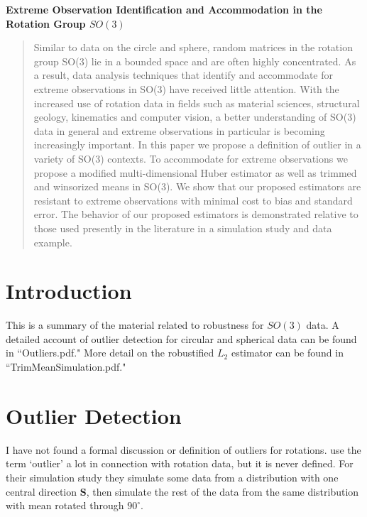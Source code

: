 \documentclass{article}\usepackage[]{graphicx}\usepackage[]{color}
\begin{document}
\begin{center}
\Large{\bf Extreme Observation Identification and Accommodation in the Rotation Group $SO(3)$}
\end{center}
\begin{abstract}
Similar to data on the circle and sphere, random matrices in the rotation group SO(3) lie in a bounded space and are often highly concentrated.  As a result, data analysis techniques that identify and accommodate for extreme observations in SO(3) have received little attention.  With the increased use of rotation data in fields such as material sciences, structural geology, kinematics and computer vision, a better understanding of SO(3) data in general and extreme observations in particular is becoming increasingly important.  In this paper we propose a definition of outlier in a variety of SO(3) contexts.  To accommodate for extreme observations we propose a modified multi-dimensional Huber estimator as well as trimmed and winsorized means in SO(3).  We show that our proposed estimators are resistant to extreme observations with minimal cost to bias and standard error.  The behavior of our proposed estimators is demonstrated relative to those used presently in the literature in a simulation study and data example.
\end{abstract}

\section{Introduction}\label{sec:intro}
This is a summary of the material related to robustness for $SO(3)$ data.  A detailed account of outlier detection for circular and spherical data can be found in ``Outliers.pdf."  More detail on the robustified $L_2$ estimator can be found in ``TrimMeanSimulation.pdf."



 
\section{Outlier Detection}\label{sec:outliers}
 
I have not found a formal discussion or definition of outliers for rotations. \cite{fletcher2008} use the term `outlier' a lot in connection with rotation data, but it is never defined.  For their simulation study they simulate some data from a distribution with one central direction $\bm S$, then simulate the rest of the data from the same distribution with mean rotated through $90^\circ$.
\end{document}
